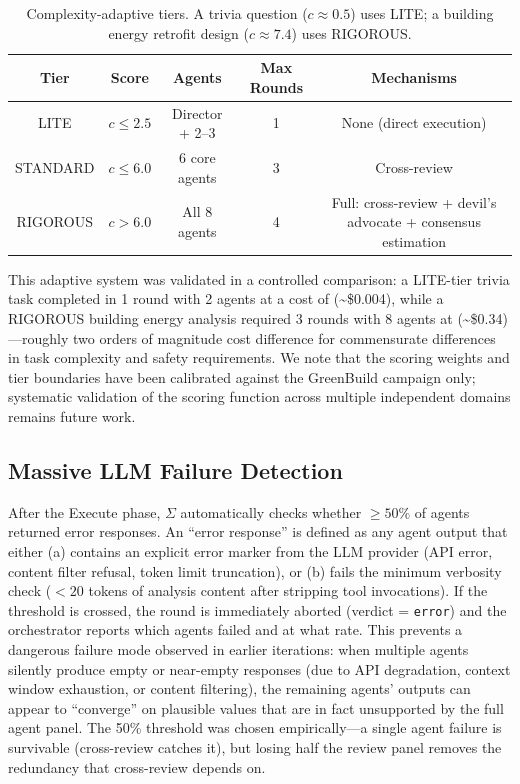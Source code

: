\documentclass[11pt,a4paper]{article}
\begin{document}
\begin{table}[htbp]
\centering
\begin{tabular}{c|c|c|c|c}
\toprule
\textbf{Tier} & \textbf{Score} & \textbf{Agents} & \textbf{Max Rounds} & \textbf{Mechanisms} \\
\midrule
LITE       & $c \leq 2.5$  & Director + 2--3 & 1 & None (direct execution) \\
STANDARD   & $c \leq 6.0$  & 6 core agents   & 3 & Cross-review \\
RIGOROUS   & $c > 6.0$     & All 8 agents    & 4 & Full: cross-review + devil's advocate + consensus estimation \\
\bottomrule
\end{tabular}
\caption{Complexity-adaptive tiers. A trivia question ($c \approx 0.5$) uses LITE; a building energy retrofit design ($c \approx 7.4$) uses RIGOROUS.}
\label{tab:tiers}
\end{table}

This adaptive system was validated in a controlled comparison: a LITE-tier trivia task completed in 1 round with 2 agents at a cost of \textbf{} (\textasciitilde\$0.004), while a RIGOROUS building energy analysis required 3 rounds with 8 agents at \textbf{} (\textasciitilde\$0.34)---roughly two orders of magnitude cost difference for commensurate differences in task complexity and safety requirements. We note that the scoring weights and tier boundaries have been calibrated against the GreenBuild campaign only; systematic validation of the scoring function across multiple independent domains remains future work.

\subsection{Massive LLM Failure Detection}

After the Execute phase, $\Sigma$ automatically checks whether $\geq 50\%$ of agents returned error responses. An ``error response'' is defined as any agent output that either (a) contains an explicit error marker from the LLM provider (API error, content filter refusal, token limit truncation), or (b) fails the minimum verbosity check ($<20$ tokens of analysis content after stripping tool invocations). If the threshold is crossed, the round is immediately aborted (verdict = \texttt{error}) and the orchestrator reports which agents failed and at what rate. This prevents a dangerous failure mode observed in earlier iterations: when multiple agents silently produce empty or near-empty responses (due to API degradation, context window exhaustion, or content filtering), the remaining agents' outputs can appear to ``converge'' on plausible values that are in fact unsupported by the full agent panel. The 50\% threshold was chosen empirically---a single agent failure is survivable (cross-review catches it), but losing half the review panel removes the redundancy that cross-review depends on.
\end{document}
